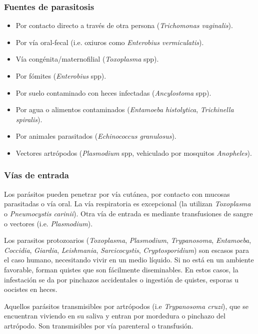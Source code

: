 \subsubsection{Fuentes de parasitosis}
\begin{itemize}[itemsep=0pt,parsep=0pt,topsep=0pt,partopsep=0pt]
    \item Por contacto directo a través de otra persona (\textit{Trichomonas vaginalis}).
    \item Por vía oral-fecal (i.e. oxiuros como \textit{Enterobius vermiculatis}).
    \item Vía congénita/maternofilial (\textit{Toxoplasma} spp).
    \item Por fómites (\textit{Enterobius} spp).
    \item Por suelo contaminado con heces infectadas (\textit{Ancylostoma} spp).
    \item Por agua o alimentos contaminados (\textit{Entamoeba histolytica}, \textit{Trichinella spiralis}).
    \item Por animales parasitados (\textit{Echinococcus granulosus}).
    \item Vectores artrópodos (\textit{Plasmodium} spp, vehiculado por mosquitos \textit{Anopheles}).
\end{itemize}
\subsubsection{Vías de entrada}
Los parásitos pueden penetrar por vía cutánea, por contacto con mucosas parasitadas o vía oral. La vía respiratoria es excepcional (la utilizan \textit{Toxoplasma} o \textit{Pneumocystis carinii}). Otra vía de entrada es mediante transfusiones de sangre o vectores (i.e. \textit{Plasmodium}).

Los parasitos protozoarios (\textit{Toxoplasma}, \textit{Plasmodium}, \textit{Trypanosoma}, \textit{Entamoeba}, \textit{Coccidia}, \textit{Giardia}, \textit{Leishmania}, \textit{Sarcicocystis}, \textit{Cryptosporidium}) son escasos para el caso humano, necesitando vivir en un medio líquido. Si no está en un ambiente favorable, forman quistes que son fácilmente diseminables. En estos casos, la infestación se da por pinchazos accidentales o ingestión de quistes, esporas u oocistes en heces.

Aquellos parásitos transmisibles por artrópodos (i.e \textit{Trypanosoma cruzi}), que se encuentran viviendo en su saliva y entran por mordedura o pinchazo del artrópodo. Son transmisibles por vía parenteral o transfusión.

